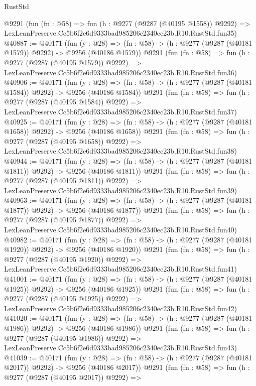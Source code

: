 \begin{lexlean}{RustStd}
\begin{coremodule}
    @9291
    (fun (fn : @58) =>
    fun (h : @9277 (@9287 (@40195 @1558)) @9292) =>
    LexLeanPreserve.Cc5b6f2e6d9333bad985206c2340ec23b.R10.RustStd.fun35)
@40887 := @40171
    (fun (y : @28) =>
    (fn : @58) -> (h : @9277 (@9287 (@40181 @1579)) @9292) -> @9256 (@40186 @1579))
    @9291
    (fun (fn : @58) =>
    fun (h : @9277 (@9287 (@40195 @1579)) @9292) =>
    LexLeanPreserve.Cc5b6f2e6d9333bad985206c2340ec23b.R10.RustStd.fun36)
@40906 := @40171
    (fun (y : @28) =>
    (fn : @58) -> (h : @9277 (@9287 (@40181 @1584)) @9292) -> @9256 (@40186 @1584))
    @9291
    (fun (fn : @58) =>
    fun (h : @9277 (@9287 (@40195 @1584)) @9292) =>
    LexLeanPreserve.Cc5b6f2e6d9333bad985206c2340ec23b.R10.RustStd.fun37)
@40925 := @40171
    (fun (y : @28) =>
    (fn : @58) -> (h : @9277 (@9287 (@40181 @1658)) @9292) -> @9256 (@40186 @1658))
    @9291
    (fun (fn : @58) =>
    fun (h : @9277 (@9287 (@40195 @1658)) @9292) =>
    LexLeanPreserve.Cc5b6f2e6d9333bad985206c2340ec23b.R10.RustStd.fun38)
@40944 := @40171
    (fun (y : @28) =>
    (fn : @58) -> (h : @9277 (@9287 (@40181 @1811)) @9292) -> @9256 (@40186 @1811))
    @9291
    (fun (fn : @58) =>
    fun (h : @9277 (@9287 (@40195 @1811)) @9292) =>
    LexLeanPreserve.Cc5b6f2e6d9333bad985206c2340ec23b.R10.RustStd.fun39)
@40963 := @40171
    (fun (y : @28) =>
    (fn : @58) -> (h : @9277 (@9287 (@40181 @1877)) @9292) -> @9256 (@40186 @1877))
    @9291
    (fun (fn : @58) =>
    fun (h : @9277 (@9287 (@40195 @1877)) @9292) =>
    LexLeanPreserve.Cc5b6f2e6d9333bad985206c2340ec23b.R10.RustStd.fun40)
@40982 := @40171
    (fun (y : @28) =>
    (fn : @58) -> (h : @9277 (@9287 (@40181 @1920)) @9292) -> @9256 (@40186 @1920))
    @9291
    (fun (fn : @58) =>
    fun (h : @9277 (@9287 (@40195 @1920)) @9292) =>
    LexLeanPreserve.Cc5b6f2e6d9333bad985206c2340ec23b.R10.RustStd.fun41)
@41001 := @40171
    (fun (y : @28) =>
    (fn : @58) -> (h : @9277 (@9287 (@40181 @1925)) @9292) -> @9256 (@40186 @1925))
    @9291
    (fun (fn : @58) =>
    fun (h : @9277 (@9287 (@40195 @1925)) @9292) =>
    LexLeanPreserve.Cc5b6f2e6d9333bad985206c2340ec23b.R10.RustStd.fun42)
@41020 := @40171
    (fun (y : @28) =>
    (fn : @58) -> (h : @9277 (@9287 (@40181 @1986)) @9292) -> @9256 (@40186 @1986))
    @9291
    (fun (fn : @58) =>
    fun (h : @9277 (@9287 (@40195 @1986)) @9292) =>
    LexLeanPreserve.Cc5b6f2e6d9333bad985206c2340ec23b.R10.RustStd.fun43)
@41039 := @40171
    (fun (y : @28) =>
    (fn : @58) -> (h : @9277 (@9287 (@40181 @2017)) @9292) -> @9256 (@40186 @2017))
    @9291
    (fun (fn : @58) =>
    fun (h : @9277 (@9287 (@40195 @2017)) @9292) =>

\end{coremodule}
\end{lexlean}
